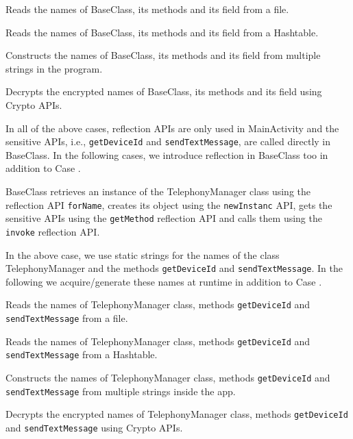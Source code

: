 \begin{description}[style=unboxed,leftmargin=0cm]
\item {} Reads the names of BaseClass, its methods and its field from a file. %

\item {} Reads the names of BaseClass, its methods and its field from a Hashtable.

\item {} Constructs the names of BaseClass, its methods and its field from multiple strings in the program.

\item {} Decrypts the encrypted names of BaseClass, its methods and its field using Crypto APIs.

In all of the above cases, reflection APIs are only used in MainActivity and the sensitive APIs, i.e., \texttt{getDeviceId} and \texttt{sendTextMessage}, are called directly in BaseClass. In the following cases, we introduce reflection in BaseClass too in addition to Case .

\item {} BaseClass retrieves  an instance of the TelephonyManager class using the reflection API \texttt{forName}, creates its object using the \texttt{newInstanc} API, gets the sensitive APIs using the \texttt{getMethod} reflection API and calls them using the \texttt{invoke} reflection API.

In the above case, we use static strings for the names of the class TelephonyManager and the methods \texttt{getDeviceId} and \texttt{sendTextMessage}. In the following we acquire/generate these names at runtime in addition to Case .

\item {} Reads the names of TelephonyManager class, methods \texttt{getDeviceId} and \texttt{sendTextMessage} from a file. 

\item {} Reads the names of TelephonyManager class, methods \texttt{getDeviceId} and \texttt{sendTextMessage} from a Hashtable. 

\item {} Constructs the names of TelephonyManager class, methods \texttt{getDeviceId} and \texttt{sendTextMessage} from multiple strings inside the app.

\item {} Decrypts the encrypted names of TelephonyManager class, methods \texttt{getDeviceId} and \texttt{sendTextMessage} using Crypto APIs.

\fi

\end{description}

